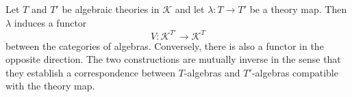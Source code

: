 Let $T$ and $T'$ be algebraic theories in $\mathcal{K}$ and let $\lambda: T \longrightarrow T'$ be a theory map. Then $\lambda$ induces a functor
$$
V: \mathcal{K}^{T'} \longrightarrow \mathcal{K}^T
$$
between the categories of algebras. Conversely, there is also a functor in the opposite direction. The two constructions are mutually inverse in the sense that they establish a correspondence between $T$-algebras and $T'$-algebras compatible with the theory map.
